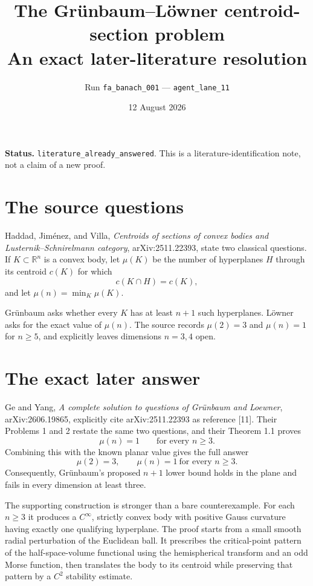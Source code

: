 \documentclass[11pt]{article}
\title{The Gr\"unbaum--L\"owner centroid-section problem\\
\large An exact later-literature resolution}
\author{Run \texttt{fa\_banach\_001} --- \texttt{agent\_lane\_11}}
\date{12 August 2026}
\begin{document}
\maketitle

\textbf{Status.} \texttt{literature\_already\_answered}.  This is a
literature-identification note, not a claim of a new proof.

\section*{The source questions}

Haddad, Jim\'enez, and Villa, \emph{Centroids of sections of convex bodies
and Lusternik--Schnirelmann category}, arXiv:2511.22393, state two classical
questions.  If $K\subset\mathbb R^n$ is a convex body, let $\mu(K)$ be the
number of hyperplanes $H$ through its centroid $c(K)$ for which
\[
  c(K\cap H)=c(K),
\]
and let $\mu(n)=\min_K\mu(K)$.

Gr\"unbaum asks whether every $K$ has at least $n+1$ such hyperplanes.
L\"owner asks for the exact value of $\mu(n)$.  The source records
$\mu(2)=3$ and $\mu(n)=1$ for $n\geq5$, and explicitly leaves dimensions
$n=3,4$ open.

\section*{The exact later answer}

Ge and Yang, \emph{A complete solution to questions of Gr\"unbaum and
Loewner}, arXiv:2606.19865, explicitly cite arXiv:2511.22393 as reference
[11].  Their Problems 1 and 2 restate the same two questions, and their
Theorem 1.1 proves
\[
  \mu(n)=1\qquad\text{for every }n\geq3.
\]
Combining this with the known planar value gives the full answer
\[
  \boxed{\mu(2)=3,\qquad \mu(n)=1\ \text{for every }n\geq3.}
\]
Consequently, Gr\"unbaum's proposed $n+1$ lower bound holds in the plane and
fails in every dimension at least three.

The supporting construction is stronger than a bare counterexample.  For
each $n\geq3$ it produces a $C^\infty$, strictly convex body with positive
Gauss curvature having exactly one qualifying hyperplane.  The proof starts
from a small smooth radial perturbation of the Euclidean ball.  It prescribes
the critical-point pattern of the half-space-volume functional using the
hemispherical transform and an odd Morse function, then translates the body
to its centroid while preserving that pattern by a $C^2$ stability estimate.
\end{document}
